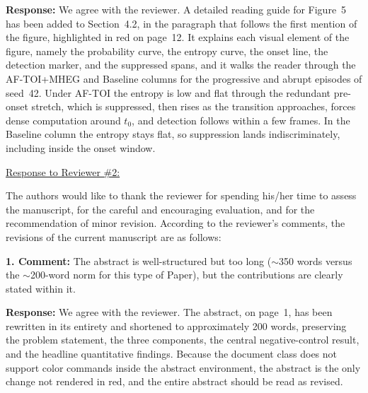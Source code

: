 \documentclass[1p,12pt,authoryear]{elsarticle}
\begin{document}
\vspace{2mm}
\noindent \textbf{Response:} We agree with the reviewer. A detailed reading guide for Figure~5 has been added to Section~4.2, in the paragraph that follows the first mention of the figure, highlighted in red on page~12. It explains each visual element of the figure, namely the probability curve, the entropy curve, the onset line, the detection marker, and the suppressed spans, and it walks the reader through the AF-TOI+MHEG and Baseline columns for the progressive and abrupt episodes of seed~42. Under AF-TOI the entropy is low and flat through the redundant pre-onset stretch, which is suppressed, then rises as the transition approaches, forces dense computation around $t_0$, and detection follows within a few frames. In the Baseline column the entropy stays flat, so suppression lands indiscriminately, including inside the onset window.

\newpage


\begin{large}
\noindent \underline{Response to Reviewer \#2:}
\end{large}

\vspace{10pt}

\noindent The authors would like to thank the reviewer for spending his/her time to assess the manuscript, for the careful and encouraging evaluation, and for the recommendation of minor revision. According to the reviewer's comments, the revisions of the current manuscript are as follows:

\vspace{0.5cm}
\noindent \textbf{1. Comment:} The abstract is well-structured but too long ($\sim$350 words versus the $\sim$200-word norm for this type of Paper), but the contributions are clearly stated within it.

\vspace{2mm}
\noindent \textbf{Response:} We agree with the reviewer. The abstract, on page~1, has been rewritten in its entirety and shortened to approximately 200 words, preserving the problem statement, the three components, the central negative-control result, and the headline quantitative findings. Because the document class does not support color commands inside the abstract environment, the abstract is the only change not rendered in red, and the entire abstract should be read as revised.
\end{document}
